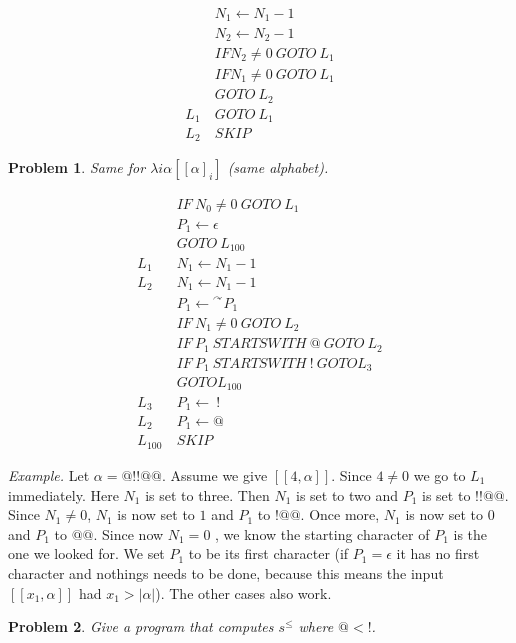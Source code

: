 \documentclass[a4paper, 12pt]{article}
\newtheorem{problem}{Problem}
\newtheorem{problem}{Problem}
\begin{document}
\begin{align*}
    &N_1 \leftarrow N_1 - 1 \\
    &N_2 \leftarrow N_2 - 1 \\
    &IF N_2 \neq 0 ~ GOTO ~ L_1 \\ 
    & IF N_1 \neq 0 ~ GOTO ~ L_1 \\ 
    &GOTO ~ L_2 \\ 
    L_1~& GOTO ~ L_1 \\ 
    L_2~ &SKIP
\end{align*}

\begin{problem}
    Same for $\lambda i\alpha[[\alpha]_i]$ (same alphabet).
\end{problem}

\begin{align*}
    &IF ~ N_0 \neq 0 ~ GOTO ~ L_1 \\ 
    &P_1 \leftarrow \epsilon \\ 
    & GOTO ~ L_{100} \\
    L_1 ~ & N_1 \leftarrow N_1 - 1 \\ 
    L_2 ~ & N_1 \leftarrow N_1 - 1 \\ 
          &P_1 \leftarrow {}^{\curvearrowright} P_1\\
    &IF ~ N_1 \neq 0 ~ GOTO ~ L_2\\
    &IF ~ P_1 ~ STARTSWITH ~ @ ~ GOTO ~ L_2 \\ 
    &IF ~ P_1 ~ STARTSWITH ~ ! ~ GOTO L_3\\ 
    & GOTO L_{100}\\
    L_3~&P_1 \leftarrow ~ !\\
    L_2 ~ &P_1 \leftarrow  @ \\ 
    L_{100} ~ & SKIP
\end{align*}

\textit{Example.} Let $\alpha = @!!@@$. Assume we give $[\![ 4, \alpha ]\!]$.
Since $4 \neq 0$ we go to $L_1$ immediately. Here $N_1$ is set to three. Then
$N_1$ is set to two and $P_1$ is set to $!!@@$. Since $N_1 \neq 0$, $N_1$ is now
set to $1$ and $P_1$ to $!@@$. Once more, $N_1$ is now set to $0$ and $P_1$ to
$@@$. Since now $N_1 = 0$ , we know the starting character of $P_1$ is the one
we looked for. We set $P_1$ to be its first character (if $P_1 = \epsilon$ it
has no first character and nothings needs to be done, because this means the
input $[\![ x_1, \alpha ]\!]$ had $x_1 > |\alpha|$). The other cases also work.

\begin{problem}
    Give a program that computes $s^{\leq}$ where $@ < !$.
\end{problem}
\end{document}
